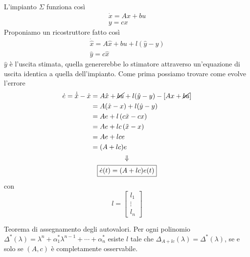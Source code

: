 \documentclass[10pt,a4paper]{book}
\begin{document}
\begin{figure}[htpb]
\end{figure}\FloatBarrier

L'impianto $\Sigma $ funziona così
\begin{gather*}
\dot{x} =Ax+bu\\
y=cx
\end{gather*}
Proponiamo un ricostruttore fatto così
\begin{gather*}
\boxed{\dot{\hat{x}} =A\hat{x} +bu+l(\hat{y} -y)}\\
\hat{y} =c\hat{x}
\end{gather*}
$\hat{y}$ è l'uscita stimata, quella genererebbe lo stimatore attraverso un'equazione di uscita identica a quella dell'impianto. Come prima possiamo trovare come evolve l'errore
\begin{gather*}
\begin{aligned}
\dot{e} =\dot{\hat{x}} -\dot{x} & =A\hat{x} +\cancel{bu} +l(\hat{y} -y) -\left[ Ax+\cancel{bu}\right]\\
 & =A(\hat{x} -x) +l(\hat{y} -y)\\
 & =Ae+l\left( c\tilde{x} -cx\right)\\
 & =Ae+lc\left(\tilde{x} -x\right)\\
 & =Ae+lce\\
 & =( A+lc) e
\end{aligned}\\
\Downarrow \\
\boxed{\dot{e}( t) =( A+lc) e( t)}
\end{gather*}
con
\begin{equation*}
l=\begin{bmatrix}
l_{1}\\
\vdots \\
l_{n}
\end{bmatrix}
\end{equation*}
\begin{theorem}
Teorema di assegnamento degli autovalori. Per ogni polinomio $\Delta ^{*}( \lambda ) =\lambda ^{n} +\alpha ^{*}_{1} \lambda ^{n-1} +\cdots +\alpha ^{*}_{n}$ esiste $l$ tale che $\Delta _{A+lc}( \lambda ) =\Delta ^{*}( \lambda )$, se e solo se $( A,c)$ è completamente osservabile.
\end{theorem}
\end{document}
